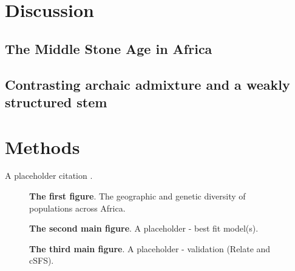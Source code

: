 \documentclass[]{article}
\begin{document}
\section*{Discussion}

\subsection*{The Middle Stone Age in Africa}

\subsection*{Contrasting archaic admixture and a weakly structured stem}

\section*{Methods}
A placeholder citation \citep{Kelleher2016-lw}.

\begin{figure}[ht]
\begin{center}
\caption{\textbf{The first figure}.
    The geographic and genetic diversity of populations across Africa.
}
\label{fig:1}
\end{center}
\end{figure}

\begin{figure}[ht]
\begin{center}
\makebox[\textwidth][c]{} %
\caption{\textbf{The second main figure}.
    A placeholder - best fit model(s).
}
\label{fig:2}
\end{center}
\end{figure}

\begin{figure}[ht]
\begin{center}
    \makebox[\textwidth][c]{} %
\caption{\textbf{The third main figure}.
    A placeholder - validation (Relate and cSFS).
}
\label{fig:r3}
\end{center}
\end{figure}
\end{document}

